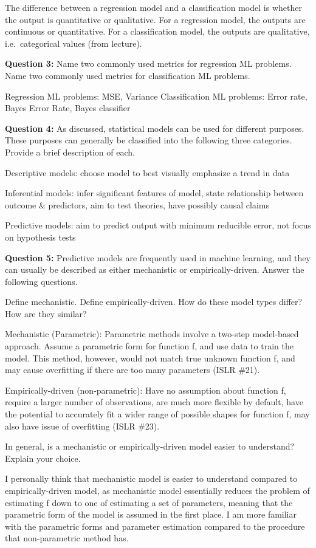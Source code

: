 \documentclass[
]{article}
\begin{document}
The difference between a regression model and a classification model is
whether the output is quantitative or qualitative. For a regression
model, the outputs are continuous or quantitative. For a classification
model, the outputs are qualitative, i.e.~categorical values (from
lecture).

\textbf{Question 3:} Name two commonly used metrics for regression ML
problems. Name two commonly used metrics for classification ML problems.

Regression ML problems: MSE, Variance Classification ML problems: Error
rate, Bayes Error Rate, Bayes classifier

\textbf{Question 4:} As discussed, statistical models can be used for
different purposes. These purposes can generally be classified into the
following three categories. Provide a brief description of each.

Descriptive models: choose model to best visually emphasize a trend in
data

Inferential models: infer significant features of model, state
relationship between outcome \& predictors, aim to test theories, have
possibly causal claims

Predictive models: aim to predict output with minimum reducible error,
not focus on hypothesis tests

\textbf{Question 5:} Predictive models are frequently used in machine
learning, and they can usually be described as either mechanistic or
empirically-driven. Answer the following questions.

Define mechanistic. Define empirically-driven. How do these model types
differ? How are they similar?

Mechanistic (Parametric): Parametric methods involve a two-step
model-based approach. Assume a parametric form for function f, and use
data to train the model. This method, however, would not match true
unknown function f, and may cause overfitting if there are too many
parameters (ISLR \#21).

Empirically-driven (non-parametric): Have no assumption about function
f, require a larger number of observations, are much more flexible by
default, have the potential to accurately fit a wider range of possible
shapes for function f, may also have issue of overfitting (ISLR \#23).

In general, is a mechanistic or empirically-driven model easier to
understand? Explain your choice.

I personally think that mechanistic model is easier to understand
compared to empirically-driven model, as mechanistic model essentially
reduces the problem of estimating f down to one of estimating a set of
parameters, meaning that the parametric form of the model is assumed in
the first place. I am more familiar with the parametric forms and
parameter estimation compared to the procedure that non-parametric
method has.
\end{document}
